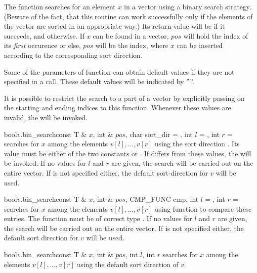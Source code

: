 The function  searches for an element $x$ in a vector using a binary search
strategy.  (Beware of the fact, that this routine can work successfully only if the elements of
the vector are sorted in an appropriate way.) Its return value will be \TRUE if it succeeds, and
\FALSE otherwise.  If $x$ can be found in a vector, $\mathit{pos}$ will hold the index of its
\emph{first} occurence or else, $\mathit{pos}$ will be the index, where $x$ can be inserted
according to the corresponding sort direction.

Some of the parameters of function  can obtain default values if they are not
specified in a call.  These default values will be indicated by ''\DEF''.

It is possible to restrict the search to a part of a vector by explicitly passing on the
starting and ending indices to this function.  Whenever these values are invalid, the \LEH will
be invoked.

\begin{cfcode}{bool}{$v$.bin_search}{const T & $x$, int & $\mathit{pos}$, char sort_dir = \DEF,
    int $l$ = \DEF, int $r$ = \DEF}%
  searches for $x$ among the elements $v[l], \dots, v[r]$ using the sort direction
  .  Its value must be either of the two constants  or
  .  If  differs from these values, the \LEH will be
  invoked.  If no values for $l$ and $r$ are given, the search will be carried out on the entire
  vector.  If  is not specified either, the default sort-direction for $v$
  will be used.
\end{cfcode}

\begin{cfcode}{bool}{$v$.bin_search}{const T & $x$, int & $\mathit{pos}$, CMP_FUNC cmp, int $l$ = \DEF, int $r$ = \DEF}
  searches for $x$ among the elements $v[l], \dots, v[r]$ using function  to
  compare these entries.  The function  must be of correct type .
  If no values for $l$ and $r$ are given, the search will be carried out on the entire vector.
  If  is not specified either, the default sort direction for $v$ will be
  used.
\end{cfcode}

\begin{cfcode}{bool}{$v$.bin_search}{const T & $x$, int & $\mathit{pos}$, int $l$, int $r$}
  searches for $x$ among the elements $v[l], \dots, v[r]$ using the default sort direction of $v$.
\end{cfcode}


